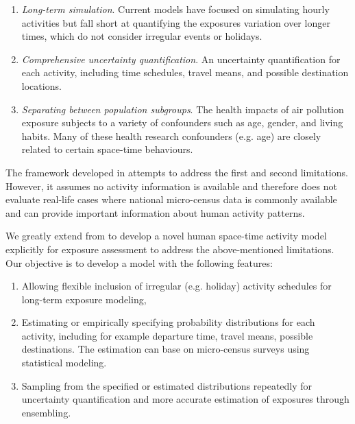 \documentclass[]{article}
\begin{document}
\begin{enumerate}
    
    \item \textit{Long-term simulation}. Current models have focused on simulating hourly activities but fall short at quantifying the exposures variation over longer times, which do not consider irregular events or holidays. 
    
    
    \item \textit{Comprehensive uncertainty quantification}. An uncertainty quantification for each activity, including time schedules, travel means, and possible destination locations.
    
    \item \textit{Separating between population subgroups}. The health impacts of air pollution exposure subjects to a variety of confounders such as age, gender, and living habits. Many of these health research confounders (e.g. age) are closely related to certain space-time behaviours.  
\end{enumerate}
 
The framework developed in \cite{lu2019activity} attempts to address the first and second limitations. However, it assumes no activity information is available and therefore does not evaluate real-life cases where national micro-census data is commonly available and can provide important information about human activity patterns.  
 
We greatly extend from \cite{lu2019activity} to develop a novel human space-time activity model explicitly for exposure assessment to address the above-mentioned limitations. Our objective is to develop a model with the following features: 

\begin{enumerate}

    \item Allowing flexible inclusion of irregular (e.g. holiday) activity schedules for long-term exposure modeling, 
    
    \item Estimating or empirically specifying probability distributions for each activity, including for example departure time, travel means, possible destinations. The estimation can base on micro-census surveys using statistical modeling.
    
    \item Sampling from the specified or estimated distributions repeatedly for uncertainty quantification and more accurate estimation of exposures through ensembling. 
\end{enumerate}
\end{document}
